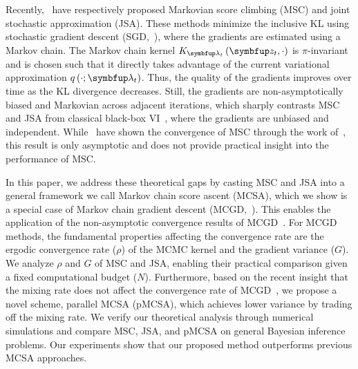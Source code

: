 Recently,~\citet{NEURIPS2020_b2070693,pmlr-v124-ou20a} have respectively proposed Markovian score climbing (MSC) and joint stochastic approximation (JSA).
These methods minimize the inclusive KL using stochastic gradient descent (SGD,~\citealt{robbins_stochastic_1951}), where the gradients are estimated using a Markov chain.
The Markov chain kernel \(K_{\vlambda_t}\left(\vz_t, \cdot\right)\) is \(\pi\)-invariant~\citep{robert_monte_2004} and is chosen such that it directly takes advantage of the current variational approximation \(q\left(\cdot; \vlambda_t\right)\).
Thus, the quality of the gradients improves over time as the KL divergence decreases.
Still, the gradients are non-asymptotically biased and Markovian across adjacent iterations, which sharply contrasts MSC and JSA from classical black-box VI~\citep{pmlr-v33-ranganath14, JMLR:v18:16-107}, where the gradients are unbiased and independent.
While~\citet{NEURIPS2020_b2070693} have shown the convergence of MSC through the work of~\citet{gu_stochastic_1998}, this result is only asymptotic and does not provide practical insight into the performance of MSC.

%

In this paper, we address these theoretical gaps by casting MSC and JSA into a general framework we call Markov chain score ascent (MCSA), which we show is a special case of Markov chain gradient descent (MCGD,~\citealt{duchi_ergodic_2012}).
This enables the application of the non-asymptotic convergence results of MCGD~\citep{duchi_ergodic_2012, NEURIPS2018_1371bcce, pmlr-v99-karimi19a, doan_finitetime_2020, doan_convergence_2020, Xiong_Xu_Liang_Zhang_2021, debavelaere_convergence_2021}.
For MCGD methods, the fundamental properties affecting the convergence rate are the ergodic convergence rate (\(\rho\)) of the MCMC kernel and the gradient variance (\(G\)).
We analyze \(\rho\) and \(G\) of MSC and JSA, enabling their practical comparison given a fixed computational budget (\(N\)).
Furthermore, based on the recent insight that the mixing rate does not affect the convergence rate of MCGD~\citep{doan_convergence_2020,doan_finitetime_2020}, we propose a novel scheme, parallel MCSA (pMCSA), which achieves lower variance by trading off the mixing rate.
We verify our theoretical analysis through numerical simulations and compare MSC, JSA, and pMCSA on general Bayesian inference problems.
Our experiments show that our proposed method outperforms previous MCSA approaches.

